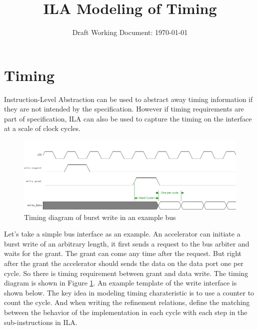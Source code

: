 \documentclass[letterpaper, 11 pt]{article}  %
\title{ILA Modeling of Timing}
\author{}
\date{Draft Working Document: \today}
\begin{document}
\maketitle

\providecommand{\bd}[0]{\mathbb{B}}
\providecommand{\st}[1]{\mathrm{#1}}
\providecommand{\ft}[1]{\mathtt{#1}}


\section*{Timing}


Instruction-Level Abstraction can be used to abstract away timing information if they are not intended by the specification. However if timing requirements are part of specification, ILA can also be used to capture the timing on the interface at a scale of clock cycles.

\begin{figure}[h]
\caption{Timing diagram of burst write in an example bus}
\label{fig:timing}
\centering
\includegraphics[width=\textwidth]{images/timing.png}
\end{figure}

Let's take a simple bus interface as an example. An accelerator can initiate a burst write of an arbitrary length, it first sends a request to the bus arbiter and waits for the grant. The grant can come any time after the request. But right after the grant the accelerator should sends the data on the data port one per cycle. So there is timing requirement between grant and data write. The timing diagram is shown in Figure \ref{fig:timing}. An example template of the write interface is shown below. The key idea in modeling timing charateristic is to use a counter to count the cycle. And when writing the refinement relations, define the matching between the behavior of the implementation in each cycle with each step in the sub-instructions in ILA.




%
%
\end{document}
